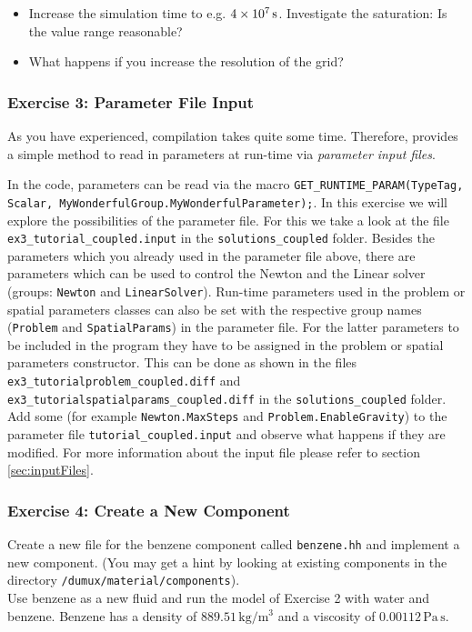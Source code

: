 \begin{itemize}
 \item Increase the simulation time to e.g. $\unit[4\times 10^7]{s}$. Investigate the saturation: Is the value range reasonable?
 \item What happens if you increase the resolution of the grid?
\end{itemize}

\subsubsection{Exercise 3: Parameter File Input}

As you have experienced, compilation takes quite some time. Therefore,
\Dumux provides a simple method to read in parameters at run-time
via \textit{parameter input files}.

In the code, parameters can be read via the macro
\texttt{GET\_RUNTIME\_PARAM(TypeTag, Scalar,
MyWonderfulGroup.MyWonderfulParameter);}. In this exercise we will explore the possibilities of the 
parameter file. For this we take a look at the file \texttt{ex3\_tutorial\_coupled.input} in the \texttt{solutions\_coupled} folder.
Besides the parameters which you already used in the parameter file above, there are parameters which can be used to control the
Newton and the Linear solver (groups: \texttt{Newton} and \texttt{LinearSolver}). Run-time parameters used in the problem or spatial parameters classes
can also be set with the respective group names (\texttt{Problem} and \texttt{SpatialParams}) in the parameter file. For the latter parameters to be included in the program
they have to be assigned in the problem or spatial parameters constructor. This can be done as shown in the files \texttt{ex3\_tutorialproblem\_coupled.diff}
and \texttt{ex3\_tutorialspatialparams\_coupled.diff} in the \texttt{solutions\_coupled} folder. Add some (for
example \texttt{Newton.MaxSteps} and \texttt{Problem.EnableGravity}) to the
parameter file \texttt{tutorial\_coupled.input} and observe what
happens if they are modified. For more information about the input file please refer to section \ref{sec:inputFiles}.

\subsubsection{Exercise 4: Create a New Component}

Create a new file for the benzene component called \texttt{benzene.hh}
and implement a new component. (You may get a hint by looking at
existing components in the directory \verb+/dumux/material/components+). \\
Use benzene as a new fluid and run the model of Exercise 2 with water
and benzene. Benzene has a density of $889.51\,\text{kg} /
\text{m}^3$ and a viscosity of $0.00112\,\text{Pa} \, \text{s}$.



